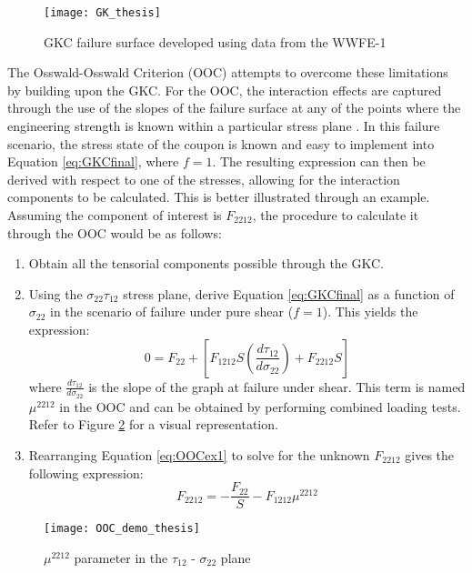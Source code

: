 \documentclass[main.tex]{subfiles}
\begin{document}
\begin{figure}[h]
	\center
	\texttt{[image: GK\_thesis]}
	\caption{GKC failure surface developed using data from the WWFE-1} \label{fig:GKClimit}
\end{figure}

The Osswald-Osswald Criterion (OOC) attempts to overcome these limitations by building upon the GKC. For the OOC, the interaction effects are captured through the use of the slopes of the failure surface at any of the points where the engineering strength is known within a particular stress plane \cite{Osswald2017a}. In this failure scenario, the stress state of the coupon is known and easy to implement into Equation \ref{eq:GKCfinal}, where $f=1$. The resulting expression can then be derived with respect to one of the stresses, allowing for the interaction components to be calculated. This is better illustrated through an example. Assuming the component of interest is $F_{2212}$, the procedure to calculate it through the OOC would be as follows:

\pagebreak
\begin{enumerate}
	\item Obtain all the tensorial components possible through the GKC.
	\item Using the $\sigma_{22}$\textendash$\tau_{12}$ stress plane, derive Equation \ref{eq:GKCfinal} as a function of $\sigma_{22}$ in the scenario of failure under pure shear ($f=1$). This yields the expression:
	\begin{equation} \label{eq:OOCex1}
	 0= F_{22}+[F_{1212}S(\frac{d\tau_{12}}{d\sigma_{22}})+F_{2212}S]
	\end{equation}
	 where $\frac{d\tau_{12}}{d\sigma_{22}}$  is the slope of the graph at failure under shear. This term is named $\mu^{2212}$ in the OOC and can be obtained by performing combined loading tests. Refer to Figure \ref{fig:OOCdemo} for a visual representation.
	\item Rearranging Equation \ref{eq:OOCex1} to solve for the unknown $F_{2212}$ gives the following expression:
	\begin{equation} \label{eq:OOCex2}
	F_{2212}=-\frac{F_{22}}{S}-F_{1212}\mu^{2212}
	\end{equation}
\end{enumerate}

\begin{figure}[h]
	\center
	\texttt{[image: OOC\_demo\_thesis]}
	\caption{$\mu^{2212}$ parameter in the $\tau_{12}$ - $\sigma_{22}$ plane} \label{fig:OOCdemo}
\end{figure}
\end{document}
